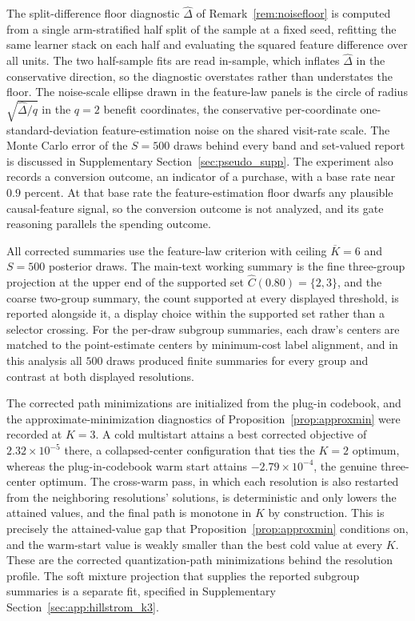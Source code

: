 \documentclass[11pt]{article}
\begin{document}
The split-difference floor diagnostic $\widehat\Delta$ of Remark~\ref{rem:noisefloor} is computed from a single arm-stratified half split of the sample at a fixed seed, refitting the same learner stack on each half and evaluating the squared feature difference over all units. The two half-sample fits are read in-sample, which inflates $\widehat\Delta$ in the conservative direction, so the diagnostic overstates rather than understates the floor. The noise-scale ellipse drawn in the feature-law panels is the circle of radius $\sqrt{\widehat\Delta/q}$ in the $q=2$ benefit coordinates, the conservative per-coordinate one-standard-deviation feature-estimation noise on the shared visit-rate scale. The Monte Carlo error of the $S=500$ draws behind every band and set-valued report is discussed in Supplementary Section~\ref{sec:pseudo_supp}. The experiment also records a conversion outcome, an indicator of a purchase, with a base rate near $0.9$ percent. At that base rate the feature-estimation floor dwarfs any plausible causal-feature signal, so the conversion outcome is not analyzed, and its gate reasoning parallels the spending outcome.

All corrected summaries use the feature-law criterion with ceiling $\overline K=6$ and $S=500$ posterior draws. The main-text working summary is the fine three-group projection at the upper end of the supported set $\widehat C(0.80)=\{2,3\}$, and the coarse two-group summary, the count supported at every displayed threshold, is reported alongside it, a display choice within the supported set rather than a selector crossing. For the per-draw subgroup summaries, each draw's centers are matched to the point-estimate centers by minimum-cost label alignment, and in this analysis all $500$ draws produced finite summaries for every group and contrast at both displayed resolutions.

The corrected path minimizations are initialized from the plug-in codebook, and the approximate-minimization diagnostics of Proposition~\ref{prop:approxmin} were recorded at $K=3$. A cold multistart attains a best corrected objective of $2.32\times10^{-5}$ there, a collapsed-center configuration that ties the $K=2$ optimum, whereas the plug-in-codebook warm start attains $-2.79\times10^{-4}$, the genuine three-center optimum. The cross-warm pass, in which each resolution is also restarted from the neighboring resolutions' solutions, is deterministic and only lowers the attained values, and the final path is monotone in $K$ by construction. This is precisely the attained-value gap that Proposition~\ref{prop:approxmin} conditions on, and the warm-start value is weakly smaller than the best cold value at every $K$. These are the corrected quantization-path minimizations behind the resolution profile. The soft mixture projection that supplies the reported subgroup summaries is a separate fit, specified in Supplementary Section~\ref{sec:app:hillstrom_k3}.
\end{document}
